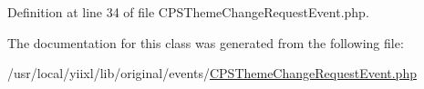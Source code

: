 Definition at line 34 of file CPSThemeChangeRequestEvent.php.



The documentation for this class was generated from the following file:\begin{DoxyCompactItemize}
\item 
/usr/local/yiixl/lib/original/events/\hyperlink{CPSThemeChangeRequestEvent_8php}{CPSThemeChangeRequestEvent.php}\end{DoxyCompactItemize}
